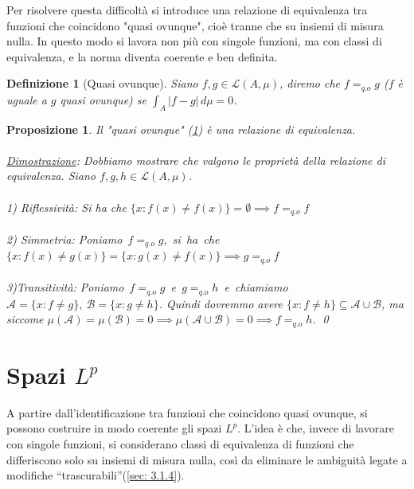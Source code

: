\documentclass[a4paper,12pt]{report}
\newtheorem{definizione}{Definizione}[chapter]
\newtheorem{proposizione}{Proposizione}[chapter]
\begin{document}
Per risolvere questa difficoltà si introduce una relazione di equivalenza tra funzioni che coincidono "quasi ovunque", cioè tranne che su insiemi di misura nulla. In questo modo si lavora non più con singole funzioni, ma con classi di equivalenza, e la norma diventa coerente e ben definita.

\begin{definizione}[Quasi ovunque]\label{def: 3.14}
    Siano $f,g \in \mathcal{L}(A,\mu)$, diremo che $f=_{q.o}g$ ($f$ è uguale a $g$ quasi ovunque) se $\displaystyle\int_A|f-g|\,d\mu =0$.
\end{definizione}

\begin{proposizione}
    Il "quasi ovunque" (\ref{def: 3.14}) è una relazione di equivalenza.
    \\
    \\ \underline{Dimostrazione}: Dobbiamo mostrare che valgono le proprietà della relazione di equivalenza. Siano $f,g,h \in \mathcal{L}(A,\mu)$.
    \\
    \\ 1) Riflessività: Si ha che $\{x:f(x)\neq f(x)\}=\emptyset\implies f=_{q.o}f$
    \\ 
    \\ 2) Simmetria: \mbox{Poniamo $f=_{q.o}g$, si ha che $\{x:f(x)\neq g(x)\}=\{x:g(x)\neq f(x)\}\implies g=_{q.o}f$}
    \\
    \\ 3)Transitività: \mbox{Poniamo $f=_{q.o}g$ e $g=_{q.o}h$ e chiamiamo $\mathcal{A}=\{x:f\neq g\},\  \mathcal{B}=\{x:g\neq h\}$.} Quindi dovremmo avere $\{x:f\neq h\} \subseteq \mathcal{A}\cup\mathcal{B}$, ma siccome $\mu(\mathcal{A})=\mu(\mathcal{B})=0 \implies \mu(\mathcal{A}\cup\mathcal{B})=0\implies f=_{q.o}h$. \qed
\end{proposizione}

\newpage

\section{Spazi $L^p$}

A partire dall’identificazione tra funzioni che coincidono quasi ovunque, si possono costruire in modo coerente gli spazi $L^p$. L’idea è che, invece di lavorare con singole funzioni, si considerano classi di equivalenza di funzioni che differiscono solo su insiemi di misura nulla, così da eliminare le ambiguità legate a modifiche “trascurabili”(\ref{sec: 3.1.4}).
\end{document}
